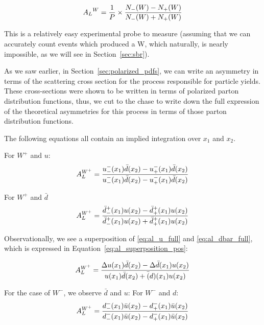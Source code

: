 \begin{equation}
  {{A_L}^W} =
  {{{1}\over{P}}\times{{N_{-}(W)-N_{+}(W)}\over{{N_{-}(W)+N_{+}(W)}}} }
  \label{eq:w_production_asymmetry}
\end{equation}

This is a relatively easy experimental probe to measure (assuming that we can
accurately count events which produced a W, which naturally, is nearly
impossible, as we will see in Section~\ref{sec:sbr}).

As we saw earlier, in Section~\ref{sec:polarized_pdfs}, we can write an
asymmetry in terms of the scattering cross section for the process responsible
for particle yields. These cross-sections were shown to be written in terms of
polarized parton distribution functions, thus, we cut to the chase to write down
the full expression of the theoretical asymmetries for this process in terms of
those parton distribution functions.

The following equations all contain an implied integration over $x_1$ and $x_2$.

For $W^+$ and $u$:
\begin{equation}
  {A_L^{W^+}} = 
  {
    {u_-^-(x_1)\bar{d}(x_2)-u_+^-(x_1)\bar{d}(x_2)}
    \over
    {u_-^-(x_1)\bar{d}(x_2)-u_+^-(x_1)\bar{d}(x_2)}
  }  
  \label{eq:al_u_full}
\end{equation}

For $W^+$ and $\bar{d}$
\begin{equation}
  {A_L^{W^+}} = 
  {
    {\bar{d}_-^+(x_1)u(x_2)-\bar{d}_+^+(x_1)u(x_2)}
    \over
    {\bar{d}_-^+(x_1)u(x_2)+\bar{d}_+^+(x_1)u(x_2)}
  }  
  \label{eq:al_dbar_full}
\end{equation}

Observationally, we see a superposition of \ref{eq:al_u_full} and
\ref{eq:al_dbar_full}, which is expressed in
Equation~\ref{eq:al_superposition_pos}:

\begin{equation}
  {A_L^{W^+}} = 
  {
    {
      \Delta u(x_1)\bar{d}(x_2)-\Delta \bar{d}(x_1)u(x_2)
    }
    \over
    {
      u(x_1)\bar d(x_2)+\bar(d)(x_1)u(x_2)
    }
  }
  \label{eq:al_superposition_pos}
\end{equation}

For the case of $W^-$, we observe $\bar{d}$ and $u$:
For $W^-$ and $d$:
\begin{equation}
  {A_L^{W^+}} = 
  {
    {d_-^-(x_1)\bar{u}(x_2)-d_+^-(x_1)\bar{u}(x_2)}
    \over
    {d_-^-(x_1)\bar{u}(x_2)-d_+^-(x_1)\bar{u}(x_2)}
  }  
  \label{eq:al_d_full}
\end{equation}


